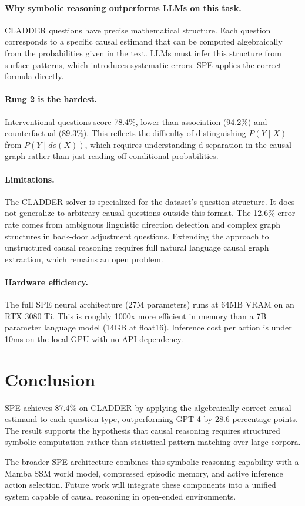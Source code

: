 \documentclass{article}
\begin{document}
\paragraph{Why symbolic reasoning outperforms LLMs on this task.}
CLADDER questions have precise mathematical structure. Each question
corresponds to a specific causal estimand that can be computed
algebraically from the probabilities given in the text. LLMs must infer
this structure from surface patterns, which introduces systematic errors.
SPE applies the correct formula directly.

\paragraph{Rung 2 is the hardest.}
Interventional questions score 78.4\%, lower than association (94.2\%)
and counterfactual (89.3\%). This reflects the difficulty of
distinguishing $P(Y \mid X)$ from $P(Y \mid do(X))$, which requires
understanding d-separation in the causal graph rather than just reading
off conditional probabilities.

\paragraph{Limitations.}
The CLADDER solver is specialized for the dataset's question structure.
It does not generalize to arbitrary causal questions outside this format.
The 12.6\% error rate comes from ambiguous linguistic direction detection
and complex graph structures in back-door adjustment questions. Extending
the approach to unstructured causal reasoning requires full natural
language causal graph extraction, which remains an open problem.

\paragraph{Hardware efficiency.}
The full SPE neural architecture (27M parameters) runs at 64MB VRAM on
an RTX 3080 Ti. This is roughly 1000x more efficient in memory than a
7B parameter language model (14GB at float16). Inference cost per action
is under 10ms on the local GPU with no API dependency.

\section{Conclusion}

SPE achieves 87.4\% on CLADDER by applying the algebraically correct
causal estimand to each question type, outperforming GPT-4 by 28.6
percentage points. The result supports the hypothesis that causal
reasoning requires structured symbolic computation rather than
statistical pattern matching over large corpora.

The broader SPE architecture combines this symbolic reasoning capability
with a Mamba SSM world model, compressed episodic memory, and active
inference action selection. Future work will integrate these components
into a unified system capable of causal reasoning in open-ended
environments.



\end{document}
